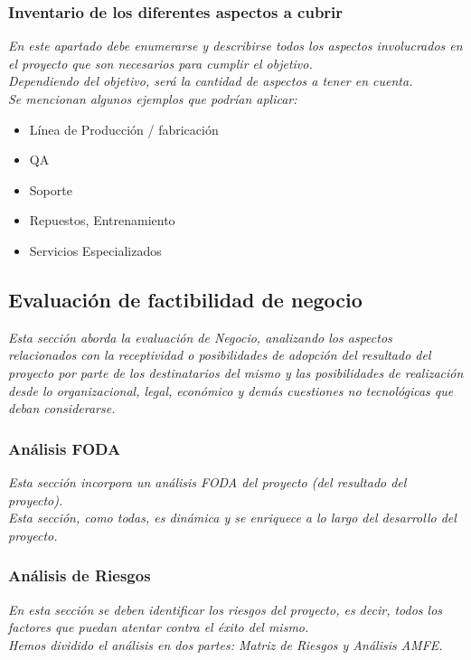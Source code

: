 \documentclass[12pt]{article}
\begin{document}
\subsubsection{Inventario de los diferentes aspectos a cubrir}
{\it
En este apartado debe enumerarse y describirse todos los aspectos involucrados en el proyecto que son necesarios para cumplir el objetivo.\\
Dependiendo del objetivo, será la cantidad de aspectos a tener en cuenta.\\
Se mencionan algunos ejemplos que podrían aplicar:

\begin{itemize}
\setlength{\itemsep}{3 pt}
    \item Línea de Producción / fabricación
    \item QA
    \item Soporte
    \item Repuestos, Entrenamiento
    \item Servicios Especializados
\end{itemize}
}


\subsection{Evaluación de factibilidad de negocio}
{\it
Esta sección aborda la evaluación de Negocio, analizando los aspectos relacionados con la receptividad o posibilidades de adopción del resultado del proyecto por parte de los destinatarios del mismo y las posibilidades de realización desde lo organizacional, legal, económico y demás cuestiones no tecnológicas que deban considerarse.
}

\subsubsection{Análisis FODA}
{\it
Esta sección incorpora un análisis FODA del proyecto (del resultado del proyecto).\\
Esta sección, como todas, es dinámica y se enriquece a lo largo del desarrollo del proyecto.
}

\subsubsection{Análisis de Riesgos}
{\it
En esta sección se deben identificar los riesgos del proyecto, es decir, todos los factores que puedan atentar contra el éxito del mismo.\\
Hemos dividido el análisis en dos partes: Matriz de Riesgos y Análisis AMFE.
}
\end{document}
